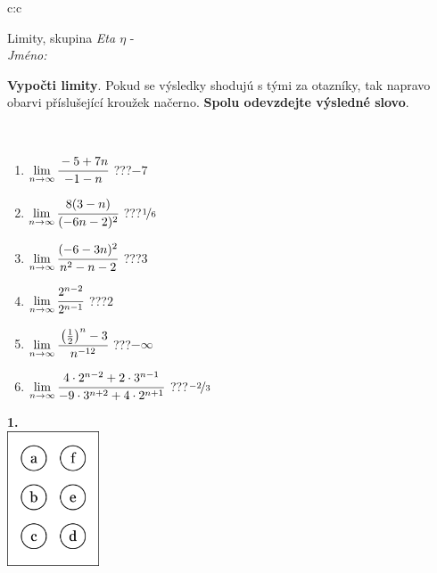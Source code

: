 \documentclass[10pt]{report}
\begin{document}
\begin{tabular}{c:c}
\begin{minipage}[c][104.5mm][t]{0.5\linewidth}
\begin{center}
\vspace{7mm}
{\huge Limity, skupina \textit{Eta $\eta$} -}\\[5mm]
\textit{Jméno:}\phantom{xxxxxxxxxxxxxxxxxxxxxxxxxxxxxxxxxxxxxxxxxxxxxxxxxxxxxxxxxxxxxxxxx}\\[5mm]
\begin{minipage}{0.95\linewidth}
\begin{center}
\textbf{Vypočti limity}. Pokud se výsledky shodujú s tými za otazníky, tak napravo\\obarvi příslušející kroužek načerno. \textbf{Spolu odevzdejte výsledné slovo}.
\end{center}
\end{minipage}
\\[1mm]
\begin{minipage}{0.79\linewidth}
\begin{center}
\begin{varwidth}{\linewidth}
\begin{enumerate}
\normalsize
\item $\lim\limits_{n\to\infty}\cfrac{-5+7n}{-1-n}$\quad \dotfill\; ???\;\dotfill \quad $-7$
\item $\lim\limits_{n\to\infty}\cfrac{8(3-n)}{(-6n-2)^2}$\quad \dotfill\; ???\;\dotfill \quad $\nicefrac{1}{6}$
\item $\lim\limits_{n\to\infty}\cfrac{(-6-3n)^2}{n^2-n-2}$\quad \dotfill\; ???\;\dotfill \quad $3$
\item $\lim\limits_{n\to\infty}\cfrac{2^{n-2}}{2^{n-1}}$\quad \dotfill\; ???\;\dotfill \quad $2$
\item $\lim\limits_{n\to\infty}\cfrac{\left(\frac{1}{2}\right)^n -3}{n^{-12}}$\quad \dotfill\; ???\;\dotfill \quad $-\infty$
\item $\lim\limits_{n\to\infty}\cfrac{4\cdot 2^{n-2}+2\cdot 3^{n-1}}{-9\cdot 3^{n+2}+4\cdot 2^{n+1}}$\quad \dotfill\; ???\;\dotfill \quad $\nicefrac{-2}{3}$
\end{enumerate}
\end{varwidth}
\end{center}
\end{minipage}
\begin{minipage}{0.20\linewidth}
\begin{center}
{\Huge\bfseries 1.} \\[2mm]
\includegraphics[height=40mm]{../images/braille.png}

\end{center}
\end{minipage}
\end{center}
\end{minipage}
\end{tabular}
\end{document}
